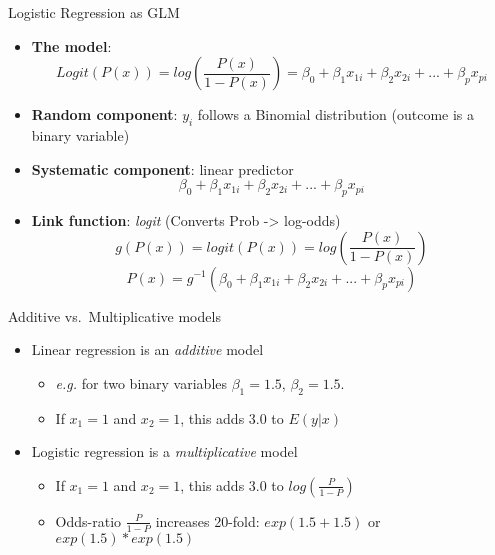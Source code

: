 \documentclass[ignorenonframetext,]{beamer}
\providecommand{\tightlist}{%
  \setlength{\itemsep}{0pt}\setlength{\parskip}{0pt}}
\begin{document}
\begin{frame}{Logistic Regression as GLM}
\protect\hypertarget{logistic-regression-as-glm}{}

\begin{itemize}
\item
  \textbf{The model}: \[
  Logit(P(x)) = log \left( \frac{P(x)}{1-P(x)} \right) = \beta_0 + \beta_1 x_{1i} + \beta_2 x_{2i} + ... + \beta_p x_{pi}
  \]
\item
  \textbf{Random component}: \(y_i\) follows a Binomial distribution
  (outcome is a binary variable)
\item
  \textbf{Systematic component}: linear predictor \[
  \beta_0 + \beta_1 x_{1i} + \beta_2 x_{2i} + ... + \beta_p x_{pi}
  \]
\item
  \textbf{Link function}: \emph{logit} (Converts Prob -\textgreater{}
  log-odds) \[
  g(P(x)) = logit(P(x)) = log\left( \frac{P(x)}{1-P(x)} \right)
  \] \[
  P(x) = g^{-1}\left( \beta_0 + \beta_1 x_{1i} + \beta_2 x_{2i} + ... + \beta_p x_{pi}
   \right)
  \]
\end{itemize}

\end{frame}

\begin{frame}{Additive vs.~Multiplicative models}
\protect\hypertarget{additive-vs.multiplicative-models}{}

\begin{itemize}
\tightlist
\item
  Linear regression is an \emph{additive} model

  \begin{itemize}
  \tightlist
  \item
    \emph{e.g.} for two binary variables \(\beta_1 = 1.5\),
    \(\beta_2 = 1.5\).
  \item
    If \(x_1=1\) and \(x_2=1\), this adds 3.0 to \(E(y|x)\)
  \end{itemize}
\item
  Logistic regression is a \emph{multiplicative} model

  \begin{itemize}
  \tightlist
  \item
    If \(x_1=1\) and \(x_2=1\), this adds 3.0 to \(log(\frac{P}{1-P})\)
  \item
    Odds-ratio \(\frac{P}{1-P}\) increases 20-fold: \(exp(1.5+1.5)\) or
    \(exp(1.5) * exp(1.5)\)
  \end{itemize}
\end{itemize}

\end{frame}
\end{document}
